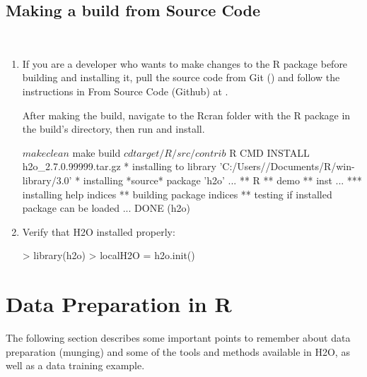 \documentclass[11pt]{article}
\begin{document}
\subsection{Making a build from Source Code} \begin{enumerate}
\item If you are a developer who wants to make changes to the R package before building and installing it, pull the source code from Git () and follow the instructions in From Source Code (Github) at .

After making the build, navigate to the Rcran folder with the R package in the build’s directory, then run and install.
\begin{spverbatim}
$ make clean
$ make build
$ cd target/R/src/contrib
$ R CMD INSTALL h2o_2.7.0.99999.tar.gz
* installing to library 'C:/Users//Documents/R/win-library/3.0'
* installing *source* package 'h2o' ...
** R
** demo
** inst
...
*** installing help indices
** building package indices
** testing if installed package can be loaded
...
DONE (h2o)
\end{spverbatim}


\item Verify that H2O installed properly:
\begin{spverbatim}

> library(h2o)
> localH2O = h2o.init()
\end{spverbatim}
\end{enumerate}

\section{Data Preparation in R}

The following section describes some important points to remember about data preparation (munging) and some of the tools and methods available in H2O, as well as a data training example. 
\end{document}
